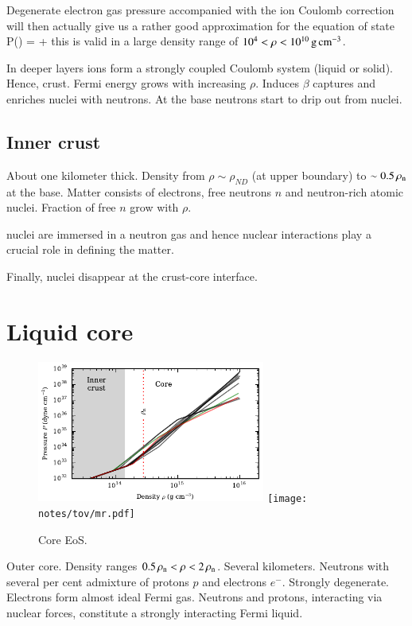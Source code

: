 Degenerate electron gas pressure accompanied with the ion Coulomb correction will then actually give us a rather good approximation for the equation of state
\be
P(\xr) = \Peid + \Pii
\ee
this is valid in a large density range of $10^{4} < \rho < 10^{10} \, \mathrm{g}\,\mathrm{cm}^{-3} $.

In deeper layers ions form a strongly coupled Coulomb system (liquid or solid).
Hence, crust.
Fermi energy grows with increasing $\rho$.
Induces $\beta$ captures and enriches nuclei with neutrons.
At the base neutrons start to drip out from nuclei.


\subsection{Inner crust}
About one kilometer thick.
Density from $\rho \sim \rho_{ND}$ (at upper boundary) to $\sim 0.5 \, \rho_{\mathrm{n}} $ at the base.
Matter consists of electrons, free neutrons $n$ and neutron-rich atomic nuclei.
Fraction of free $n$ grow with $\rho$.

nuclei are immersed in a neutron gas and hence nuclear interactions play a crucial role in defining the matter.

Finally, nuclei disappear at the crust-core interface.





\section{Liquid core}
\begin{figure}
\centering
\includegraphics[width=7.5cm]{notes/eos/dense_eos.pdf}
\texttt{[image: notes/tov/mr.pdf]}
\caption{\label{fig:core}
Core EoS.
}
\end{figure}

Outer core.
Density ranges $0.5 \, \rho_{\mathrm{n}}  < \rho < 2\, \rho_{\mathrm{n}} $.
Several kilometers.
Neutrons with several per cent admixture of protons $p$ and electrons $e^{-}$.
Strongly degenerate.
Electrons form almost ideal Fermi gas.
Neutrons and protons, interacting via nuclear forces, constitute a strongly interacting Fermi liquid.

